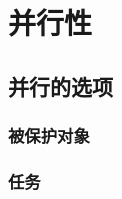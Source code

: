 %
%
%

\chapter{并行性}
\label{c:concurrency}

\section{并行的选项}

\subsection{被保护对象}
\label{c:concurrency:options:protected}
\subsection{任务}
\label{c:concurrency:options:task}
